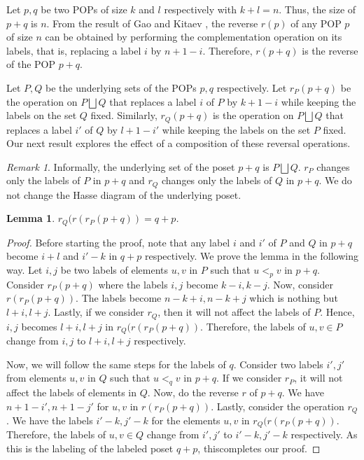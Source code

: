 \documentclass[12pt, english, a4paper]{article}
\theoremstyle{plain}
\newtheorem{lemma}[theorem]{Lemma}
\theoremstyle{definition}
\theoremstyle{remark}
\newtheorem{remark}[theorem]{Remark}
\begin{document}

Let $p,q$ be two POPs of size $k$ and $l$ respectively with $k+l=n$.  Thus, the size of $p+q$ is $n$. From the result of Gao and Kitaev \cite[Theorem 1]{gao-kitaev-length-4-5-pops}, the reverse $r(p)$ of any POP $p$ of size $n$ can be obtained by performing the complementation operation on its labels, that is, replacing a label $i$ by $n+1-i$. Therefore, $r(p+q)$ is the reverse of the POP $p+q$.

Let $P,Q$ be the underlying sets of the POPs $p,q$ respectively. Let $r_P(p+q)$ be the operation on $P\bigsqcup Q$ that replaces a label $i$ of $P$ by $k+1-i$ while keeping the labels on the %
set $Q$ fixed. Similarly, $r_Q(p+q)$ is the operation on $P\bigsqcup Q$ that replaces a label $i'$ of $Q$ by $l+1-i'$ while keeping the labels on the%
set $P$ fixed. Our next result explores the effect of a composition of these reversal operations.
\begin{remark}
    Informally, the underlying set of the poset $p+q$ is $P\bigsqcup Q$. $r_P$ changes only the labels of $P$ in $p+q$ and $r_Q$ changes only the labels of $Q$ in $p+q$. We do not change the Hasse diagram of the underlying poset.
\end{remark}
\begin{lemma}\label{p+q to q+p}
      $r_Q(r(r_P(p+q))=q+p$.
\end{lemma}
\begin{proof}
    Before starting the proof, note that any label $i$ and $i'$ of $P$ and $Q$ in $p+q$ become 
    $i+l$ and $i'-k$ in $q+p$ respectively. We prove the lemma in the following way. Let $i, j$ 
be two labels of elements $u,v$ in $P$ such that $u<_p v$ in $p+q$. Consider $r_P(p+q)$ where 
the labels $i,j$ become $k-i,k-j$. Now, consider $r(r_P(p+q))$. The labels become $n-k+i,n-k+j$ 
which is nothing but $l+i,l+j$. Lastly, if we consider $r_Q$, then it will not affect the labels 
of $P$. Hence, $i,j$ becomes $l+i,l+j$ in $r_Q(r(r_P(p+q))$. Therefore, the labels of 
$u,v \in P$ change from $i,j$ to $l+i,l+j$ %
respectively.  

 Now, we will follow the same steps for the labels of $q$. Consider two labels $i',j'$ from
 elements $u,v$ in $Q$ such that $u<_q v$ in $p+q$. If we consider $r_P$, it will not affect the 
 labels of elements in $Q$. Now, do the reverse $r$ of $p+q$. We have $n+1-i', n+1-j'$ for $u,v$ 
 in $r(r_P(p+q))$. Lastly, consider the operation $r_Q$. We have the labels $i'-k, j'-k$ for the 
 elements $u,v$ in $r_Q(r(r_P(p+q))$. Therefore, the labels of $u,v \in Q$ change 
 from $i',j'$ to $i'-k,j'-k$ respectively.  As this is the labeling of the labeled poset $q+p$, thiscompletes our proof.
\end{proof}
\end{document}
